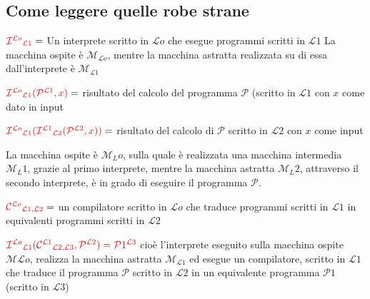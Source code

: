 \documentclass[a4paper,11pt,hidelinks]{book}
\theoremstyle{definition}
\begin{document}
    \newpage
    
    
    \begin{mdframed}
    \section{Come leggere quelle robe strane}
    
    \vspace{0.25cm}
    \(\textcolor{red}{\mathcal{I}^{\mathcal{L}o}{_{\mathcal{L}1}}} = \)
    Un interprete scritto in $\mathcal{L}o$ che esegue programmi scritti in $\mathcal{L}1$
    \flushleft
    La macchina ospite è $\mathcal{M}_{\mathcal{L}o}$, mentre la macchina astratta realizzata su di essa dall'interprete è $\mathcal{M}_{\mathcal{L}1}$
    
    \vspace{0.25cm}
    \( \textcolor{red}{\mathcal{I}^{\mathcal{L}o}{_{\mathcal{L}1}}(\mathcal{P}^{\mathcal{L}1}, x)} = \)
    risultato del calcolo del programma $\mathcal{P}$ (scritto in $\mathcal{L}1$ con $x$ come dato in input
    
    \vspace{0.25cm}
    \( \textcolor{red}{\mathcal{I}^{\mathcal{L}o}{_{\mathcal{L}1}}(\mathcal{I}^{\mathcal{L}1}{_{\mathcal{L}2}}(\mathcal{P}^{\mathcal{L}2}, x))} = \)
    risultato del calcolo di $\mathcal{P}$ scritto in $\mathcal{L}2$ con $x$ come input 
    
    \flushleft
    La macchina ospite è $\mathcal{M}{_{L}o}$, sulla quale è realizzata una macchina intermedia $\mathcal{M}{_{L}1}$, grazie al primo interprete, mentre la macchina astratta $\mathcal{M}{_{L}2}$, attraverso il secondo interprete, è in grado di eseguire il programma $\mathcal{P}$. 
    
    \vspace{0.25cm}
    \( \textcolor{red}{\mathcal{C}^{\mathcal{L}o}{_{\mathcal{L}1, \mathcal{L}2}}} = \)
    un compilatore scritto in $\mathcal{L}o$ che traduce programmi scritti in $\mathcal{L}1$ in equivalenti programmi scritti in $\mathcal{L}2$ 
    
    \vspace{0.25cm}
    \( \textcolor{red}{\mathcal{I}^{\mathcal{L}o}{_{\mathcal{L}1}}(\mathcal{C}^{\mathcal{L}1}{_{\mathcal{L}2, \mathcal{L}3}}, \mathcal{P}^{\mathcal{L}2}) = \mathcal{P}1^{\mathcal{L}3}} \)
    cioè l'interprete eseguito sulla macchina ospite $\mathcal{ML}o$, realizza la macchina astratta $\mathcal{M}_{\mathcal{L}1}$ ed esegue un compilatore, scritto in $\mathcal{L}1$ che traduce il programma $\mathcal{P}$ scritto in $\mathcal{L}2$ in un equivalente programma $\mathcal{P}1$ (scritto in $\mathcal{L}3$)
    
    \end{mdframed}
    
\end{document}
